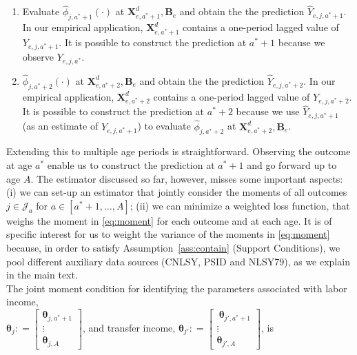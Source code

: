\begin{enumerate}
\item Evaluate $\hat{\phi}_{j,a^*+1} \left( \cdot \right)$ at  $\bm{X}_{e,a^*+1}^d, \bm{B}_{e}$ and obtain the the prediction $\hat{Y}_{e,j,a^*+1}$. In our empirical application, $\bm{X}_{e,a^*+1}^d$ contains a one-period lagged value of $Y_{e,j,a^*+1}$. It is possible to construct the prediction at $a^*+1$ because we observe $Y_{e,j,a^*}$.

\item $\hat{\phi}_{j,a^*+2} \left( \cdot \right)$ at  $\bm{X}_{e,a^*+2}^d, \bm{B}_{e}$ and obtain the the prediction $\hat{Y}_{e,j,a^*+2}$. In our empirical application, $\bm{X}_{e,a^*+2}^d$ contains a one-period lagged value of $Y_{e,j,a^*+2}$. It is possible to construct the prediction at $a^*+2$ because we use $\hat{Y}_{e,j,a^*+1}$ (as an estimate of $Y_{e,j,a^*+1}$) to evaluate $\hat{\phi}_{j,a^*+2}$ at  $\bm{X}_{e,a^*+2}^d, \bm{B}_{e}$.
\end{enumerate}

\noindent Extending this to multiple age periods is straightforward. Observing the outcome at age $a^*$ enable us to construct the prediction at $a^*+1$ and go forward up to age $A$. The estimator discussed so far, however, misses some important aspects: (i) we can set-up an estimator that jointly consider the moments of all outcomes $j \in \mathcal{J}_{a}$ for $a \in [a^*+1, \ldots, A]$; (ii) we can minimize a weighted loss function, that weighs the moment in \eqref{eq:moment} for each outcome and at each age. It is of specific interest for us to weight the variance of the moments in \eqref{eq:moment} because, in order to satisfy Assumption~\ref{ass:contain} (Support Conditions), we pool different auxiliary data sources (CNLSY, PSID and NLSY79), as we explain in the main text.\\ 

\noindent The joint moment condition for identifying the parameters associated with labor income, \\

$\bm{\theta}_{j} : =  \begin{bmatrix} \bm{\theta}_{j,a^*+1} \\ \vdots \\ \bm{\theta}_{j,A} \end{bmatrix}$, and transfer income, $\bm{\theta}_{j'}  : =  \begin{bmatrix} \ \bm{\theta}_{j',a^*+1} \\ \vdots \\ \bm{\theta}_{j',A}\end{bmatrix}$, is \\

